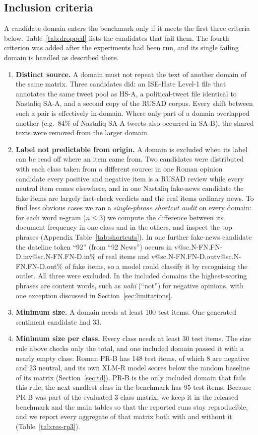 \documentclass[acmsmall,screen]{acmart}
\makeatletter
\newcommand{\pending}[1]{{\color{red}[PENDING: #1]}}
\newcommand{\val}[1]{\ifcsname v@#1\endcsname\csname v@#1\endcsname\else\pending{#1}\fi}
\makeatother
\begin{document}
\subsection{Inclusion criteria}\label{sec:criteria}
A candidate domain enters the benchmark only if it meets the first three criteria below. Table~\ref{tab:dropped} lists the \NumDropped{} candidates that fail them. The fourth criterion was added after the experiments had been run, and its single failing domain is handled as described there.

\begin{enumerate}[leftmargin=*,itemsep=2pt]
\item \textbf{Distinct source.} A domain must not repeat the text of another domain of the same matrix. Three candidates did: an ISE-Hate Level-1 file \citep{akram2023isehate} that annotates the same tweet pool as HS-A, a political-tweet file identical to Nastaliq SA-A, and a second copy of the RUSAD corpus. Every shift between such a pair is effectively in-domain. Where only part of a domain overlapped another (e.g.\ 84\% of Nastaliq SA-A tweets also occurred in SA-B), the shared texts were removed from the larger domain.
\item \textbf{Label not predictable from origin.} A domain is excluded when its label can be read off where an item came from. Two candidates were distributed with each class taken from a different source: in one Roman opinion candidate every positive and negative item is a RUSAD review while every neutral item comes elsewhere, and in one Nastaliq fake-news candidate the fake items are largely fact-check verdicts and the real items ordinary news. To find less obvious cases we ran a \emph{single-phrase shortcut audit} on every domain: for each word n-gram ($n\leq 3$) we compute the difference between its document frequency in one class and in the others, and inspect the top phrases (Appendix Table~\ref{tab:shortcuts}). In one further fake-news candidate the dateline token ``92'' (from ``92 News'') occurs in \val{sc.N-FN.FN-D.in}\% of real items and \val{sc.N-FN.FN-D.out}\% of fake items, so a model could classify it by recognising the outlet. All three were excluded. In the included domains the highest-scoring phrases are content words, such as \textit{nahi} (``not'') for negative opinions, with one exception discussed in Section~\ref{sec:limitations}.
\item \textbf{Minimum size.} A domain needs at least 100 test items. One generated sentiment candidate had 33.
\item \textbf{Minimum size per class.} Every class needs at least 30 test items. The size rule above checks only the total, and one included domain passed it with a nearly empty class: Roman PR-B has 148 test items, of which 8 are negative and 23 neutral, and its own XLM-R model scores below the random baseline of its matrix (Section~\ref{sec:td}). PR-B is the only included domain that fails this rule; the next smallest class in the benchmark has 95 test items. Because PR-B was part of the evaluated 3-class matrix, we keep it in the released benchmark and the main tables so that the reported runs stay reproducible, and we report every aggregate of that matrix both with and without it (Table~\ref{tab:res-rp3}).

\end{enumerate}
\end{document}
